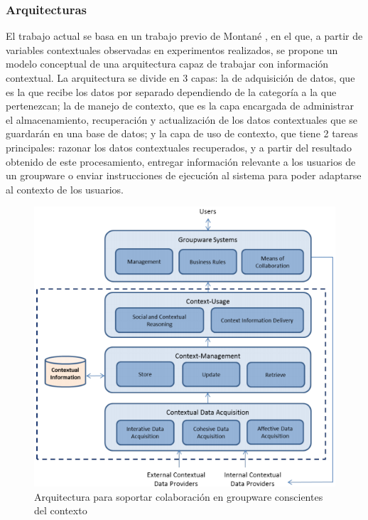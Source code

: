 \subsubsection{Arquitecturas}

El trabajo actual se basa en un trabajo previo de Montan\'e \cite{montane2013context}, en el que, a partir de variables contextuales observadas en experimentos realizados, se propone un modelo conceptual de una arquitectura capaz de trabajar con informaci\'on contextual. La arquitectura se divide en 3 capas: la de adquisici\'on de datos, que es la que recibe los datos por separado dependiendo de la categor\'ia a la que pertenezcan; la de manejo de contexto, que es la capa encargada de administrar el almacenamiento, recuperaci\'on y actualizaci\'on de los datos contextuales que se guardar\'an en una base de datos; y la capa de uso de contexto, que tiene 2 tareas principales: razonar los datos contextuales recuperados, y a partir del resultado obtenido de este procesamiento, entregar informaci\'on relevante a los usuarios de un groupware o enviar instrucciones de ejecuci\'on al sistema para poder adaptarse al contexto de los usuarios.

\begin{figure}[h!]
  \centering
  \includegraphics[scale=0.6]{images/arch}
  \caption{Arquitectura para soportar colaboraci\'on en groupware conscientes del contexto \cite{montane2013context}}
\end{figure}

